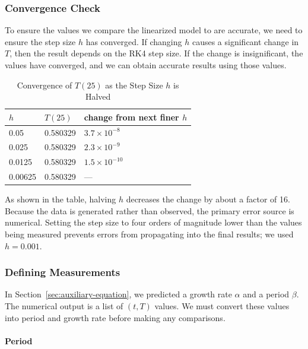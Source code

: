     \subsubsection{Convergence Check}\label{subsubsec:convergence-check}

    To ensure the values we compare the linearized model to are accurate, we need to ensure the step size $h$ has converged. If changing $h$ causes a significant change in $T$, then the result depends on the RK4 step size. If the change is insignificant, the values have converged, and we can obtain accurate results using those values.

    \begin{table}[H]
        \centering
        \begin{tabular}{lll}
            \toprule
            \textbf{$h$} & \textbf{$T(25)$} & \textbf{change from next finer $h$} \\
            \midrule
            0.05    & 0.580329 & $3.7\times10^{-8}$ \\
            0.025   & 0.580329 & $2.3\times10^{-9}$ \\
            0.0125  & 0.580329 & $1.5\times10^{-10}$ \\
            0.00625 & 0.580329 & --- \\
            \bottomrule
        \end{tabular}
        \caption{Convergence of $T(25)$ as the Step Size $h$ is Halved}
        \label{tab:convergence}
    \end{table}

    As shown in the table, halving $h$ decreases the change by about a factor of 16. Because the data is generated rather than observed, the primary error source is numerical. Setting the step size to four orders of magnitude lower than the values being measured prevents errors from propagating into the final results; we used $h=0.001$.

    \subsubsection{Defining Measurements}\label{subsubsec:defining-measurements}

    In Section~\ref{sec:auxiliary-equation}, we predicted a growth rate $\alpha$ and a period $\beta$. The numerical output is a list of $(t,T)$ values. We must convert these values into period and growth rate before making any comparisons.

    \paragraph{Period}

